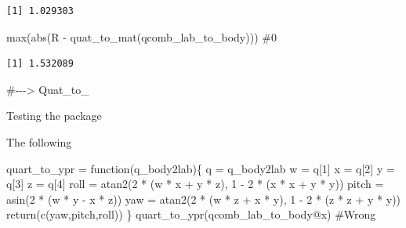 \documentclass[
  letterpaper,
  DIV=11,
  numbers=noendperiod]{scrartcl}
\newenvironment{Shaded}{\begin{snugshade}}{\end{snugshade}}
\newcommand{\CommentTok}[1]{\textcolor[rgb]{0.37,0.37,0.37}{#1}}
\newcommand{\ControlFlowTok}[1]{\textcolor[rgb]{0.00,0.23,0.31}{#1}}
\newcommand{\DecValTok}[1]{\textcolor[rgb]{0.68,0.00,0.00}{#1}}
\newcommand{\FunctionTok}[1]{\textcolor[rgb]{0.28,0.35,0.67}{#1}}
\newcommand{\NormalTok}[1]{\textcolor[rgb]{0.00,0.23,0.31}{#1}}
\newcommand{\OtherTok}[1]{\textcolor[rgb]{0.00,0.23,0.31}{#1}}
\newcommand{\SpecialCharTok}[1]{\textcolor[rgb]{0.37,0.37,0.37}{#1}}
\begin{document}
\begin{verbatim}
[1] 1.029303
\end{verbatim}

\begin{Shaded}
\begin{Highlighting}[]
  \FunctionTok{max}\NormalTok{(}\FunctionTok{abs}\NormalTok{(R }\SpecialCharTok{{-}} \FunctionTok{quat\_to\_mat}\NormalTok{(qcomb\_lab\_to\_body))) }\CommentTok{\#0}
\end{Highlighting}
\end{Shaded}

\begin{verbatim}
[1] 1.532089
\end{verbatim}

\begin{Shaded}
\begin{Highlighting}[]
  \CommentTok{\#{-}{-}{-}\textgreater{} Quat\_to\_}
\end{Highlighting}
\end{Shaded}

Testing the package

The following

\begin{Shaded}
\begin{Highlighting}[]
\NormalTok{quart\_to\_ypr }\OtherTok{=} \ControlFlowTok{function}\NormalTok{(q\_body2lab)\{}
\NormalTok{    q }\OtherTok{=}\NormalTok{ q\_body2lab}
\NormalTok{    w }\OtherTok{=}\NormalTok{ q[}\DecValTok{1}\NormalTok{]}
\NormalTok{    x }\OtherTok{=}\NormalTok{ q[}\DecValTok{2}\NormalTok{]}
\NormalTok{    y }\OtherTok{=}\NormalTok{ q[}\DecValTok{3}\NormalTok{]}
\NormalTok{    z }\OtherTok{=}\NormalTok{ q[}\DecValTok{4}\NormalTok{]}
\NormalTok{    roll }\OtherTok{=} \FunctionTok{atan2}\NormalTok{(}\DecValTok{2} \SpecialCharTok{*}\NormalTok{ (w }\SpecialCharTok{*}\NormalTok{ x }\SpecialCharTok{+}\NormalTok{ y }\SpecialCharTok{*}\NormalTok{ z), }\DecValTok{1} \SpecialCharTok{{-}} \DecValTok{2} \SpecialCharTok{*}\NormalTok{ (x }\SpecialCharTok{*}\NormalTok{ x }\SpecialCharTok{+}\NormalTok{ y }\SpecialCharTok{*}\NormalTok{ y))}
\NormalTok{    pitch }\OtherTok{=} \FunctionTok{asin}\NormalTok{(}\DecValTok{2} \SpecialCharTok{*}\NormalTok{ (w }\SpecialCharTok{*}\NormalTok{ y }\SpecialCharTok{{-}}\NormalTok{ x }\SpecialCharTok{*}\NormalTok{ z))}
\NormalTok{    yaw }\OtherTok{=} \FunctionTok{atan2}\NormalTok{(}\DecValTok{2} \SpecialCharTok{*}\NormalTok{ (w }\SpecialCharTok{*}\NormalTok{ z }\SpecialCharTok{+}\NormalTok{ x }\SpecialCharTok{*}\NormalTok{ y), }\DecValTok{1} \SpecialCharTok{{-}} \DecValTok{2} \SpecialCharTok{*}\NormalTok{ (z }\SpecialCharTok{*}\NormalTok{ z }\SpecialCharTok{+}\NormalTok{ y }\SpecialCharTok{*}\NormalTok{ y))}
    \FunctionTok{return}\NormalTok{(}\FunctionTok{c}\NormalTok{(yaw,pitch,roll))}
\NormalTok{\}}
\FunctionTok{quart\_to\_ypr}\NormalTok{(qcomb\_lab\_to\_body}\SpecialCharTok{@}\NormalTok{x) }\CommentTok{\#Wrong }
\end{Highlighting}
\end{Shaded}
\end{document}
